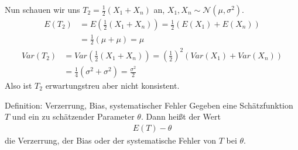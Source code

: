 \documentclass[t,11pt,aspectratio=169]{beamer}
\begin{document}
\begin{frame}
Nun schauen wir uns $T_2 = \frac{1}{2}(X_1+X_n)$ an, $X_1,X_n\sim \mathcal{N}(\mu,\sigma^2)$.
\begin{align*}
E(T_2) &= E\left(\frac{1}{2}(X_1+X_n)\right)  
= \frac{1}{2}(E(X_1)+E(X_n)) \\
&=  \frac{1}{2} (\mu + \mu) 
= \mu
\end{align*}
\pause
\begin{align*}
Var(T_2) &= Var\left(\frac{1}{2}(X_1+X_n)\right) 
= \left(\frac{1}{2}\right)^2 (Var(X_1)+Var(X_n))\\
&=  \frac{1}{4}(\sigma^2+\sigma^2)
= \frac{\sigma^2}{2}  
\end{align*}
Also ist $T_2$ erwartungstreu aber nicht konsistent.
\end{frame}

\begin{alertblock}{Definition: Verzerrung, Bias, systematischer Fehler}
	Gegeben eine Schätzfunktion $T$ und ein zu schätzender Parameter $\theta$. Dann heißt der Wert
	\begin{align*}
	E(T)-\theta
	\end{align*}
	die Verzerrung, der Bias oder der systematische Fehler von $T$ bei $\theta$.
\end{alertblock}
\end{document}
